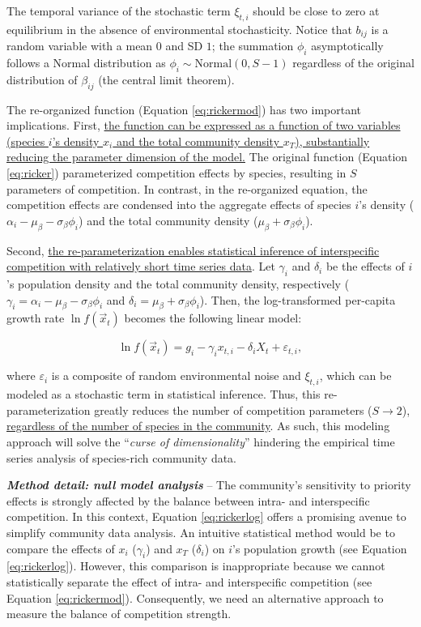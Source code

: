 \documentclass[12pt, class=article, crop=false]{standalone}
\begin{document}
The temporal variance of the stochastic term $\xi_{t,i}$ should be close to zero at equilibrium in the absence of environmental stochasticity.
Notice that $b_{ij}$ is a random variable with a mean $0$ and SD $1$; the summation $\phi_i$ asymptotically follows a Normal distribution as $\phi_i \sim \mbox{Normal}(0, S - 1)$ regardless of the original distribution of $\beta_{ij}$ (the central limit theorem).

The re-organized function (Equation \ref{eq:rickermod}) has two important implications.
First, \ul{the function can be expressed as a function of two variables (species $i$'s density $x_i$ and the total community density $x_T$), substantially reducing the parameter dimension of the model.}
The original function (Equation \ref{eq:ricker}) parameterized competition effects by species, resulting in $S$ parameters of competition.
In contrast, in the re-organized equation, the competition effects are condensed into the aggregate effects of species $i$'s density ($\alpha_i - \mu_{\beta} - \sigma_{\beta} \phi_i$) and the total community density ($\mu_{\beta} + \sigma_{\beta} \phi_i$).

Second, \ul{the re-parameterization enables statistical inference of interspecific competition with relatively short time series data}.
Let $\gamma_i$ and $\delta_i$ be the effects of $i$'s population density and the total community density, respectively ($\gamma_i = \alpha_i - \mu_{\beta} - \sigma_{\beta} \phi_i$ and $\delta_i = \mu_{\beta} + \sigma_{\beta} \phi_i$).
Then, the log-transformed per-capita growth rate $\ln f(\overset{\rightarrow}{x}_{t})$ becomes the following linear model:

\begin{equation}
\label{eq:rickerlog}
    \ln f(\overset{\rightarrow}{x}_{t}) = g_i - \gamma_i x_{t,i} - \delta_i X_t + \varepsilon_{t,i},
\end{equation}

where $\varepsilon_i$ is a composite of random environmental noise and $\xi_{t,i}$, which can be modeled as a stochastic term in statistical inference. Thus, this re-parameterization greatly reduces the number of competition parameters ($S \rightarrow 2$), \ul{regardless of the number of species in the community}.
As such, this modeling approach will solve the ``\textit{curse of dimensionality}'' hindering the empirical time series analysis of species-rich community data.

\textbf{\textit{Method detail: null model analysis}} --
The community's sensitivity to priority effects is strongly affected by the balance between intra- and interspecific competition.
In this context, Equation \ref{eq:rickerlog} offers a promising avenue to simplify community data analysis. 
An intuitive statistical method would be to compare the effects of $x_i$ ($\gamma_i$) and $x_T$ ($\delta_i$) on $i$'s population growth (see Equation \ref{eq:rickerlog}).
However, this comparison is inappropriate because we cannot statistically separate the effect of intra- and interspecific competition (see Equation \ref{eq:rickermod}).
Consequently, we need an alternative approach to measure the balance of competition strength.
\end{document}
